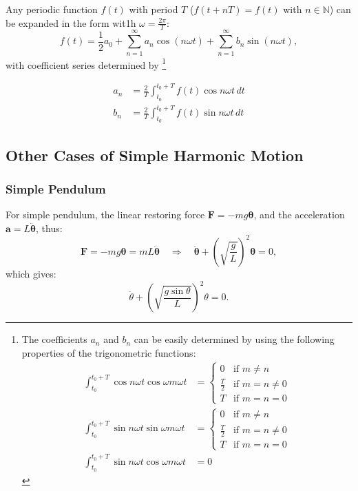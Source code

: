 \documentclass[UTF8]{book}
\begin{document}
Any periodic function $f(t)$ with period $T$ ($f(t+nT)=f(t)$ with $n\in \mathbb{N}$) can be expanded in the form wit1h $\omega =\frac{2\pi}{T}$:
\begin{equation}\label{eq:3}
f(t)=\frac{1}{2}a_0+\sum _{n=1}^{\infty}a_n \cos (n\omega t)+\sum _{n=1}^{\infty}b_n \sin (n\omega t),
\end{equation}
with coefficient series determined by \footnote{The coefficients $a_n$ and $b_n$ can be easily determined by
using the following properties of the trigonometric functions:
\begin{align*}
\int _{t_0}^{t_0+T}\cos n\omega t\cos \omega m\omega t&=\begin{cases}
0&\text{if } m\neq n\\
\frac{T}{2}&\text{if }m=n\neq 0\\
T&\text{if }m=n=0
\end{cases}\\
\int _{t_0}^{t_0+T}\sin n\omega t\sin \omega m\omega t&=\begin{cases}
0&\text{if } m\neq n\\
\frac{T}{2}&\text{if }m=n\neq 0\\
T&\text{if }m=n=0
\end{cases}\\
\int _{t_0}^{t_0+T}\sin n\omega t\cos \omega m\omega t&=0
\end{align*}
}

\begin{align*}
a_n&=\frac{2}{T}\int _{t_0}^{t_0+T}f(t)\cos n\omega t\,dt\\
b_n&=\frac{2}{T}\int _{t_0}^{t_0+T}f(t)\sin n\omega t\,dt
\end{align*}
\subsection{Other Cases of Simple Harmonic Motion}
\subsubsection{Simple Pendulum}
For simple pendulum, the linear restoring force $\mathbf{F}= - mg \bm \theta $, and the acceleration $\mathbf{a}=L \ddot{\bm\theta}$, thus:
\[\mathbf{F}=-mg \bm{\theta }=mL \ddot{\bm\theta}\quad \Rightarrow \quad\ddot{\bm{\theta}}+\left(\sqrt{\frac{g}{L}}\right)^2\bm{\theta}=0,\]
which gives:
\[\ddot{\theta }+\left(\sqrt{\frac{g\sin \theta }{L}}\right)^2\theta =0.\]
\end{document}
